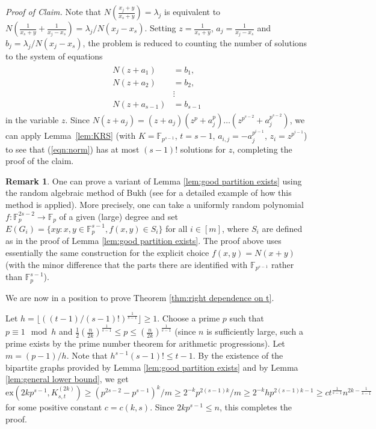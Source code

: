 \documentclass[a4paper,11pt]{article}
\makeatletter
\renewenvironment{proof}[1][\proofname] {\par\pushQED{\qed}\normalfont\topsep6\p@\@plus6\p@\relax\trivlist\item[\hskip\labelsep\bfseries#1\@addpunct{.}]\ignorespaces}{\popQED\endtrivlist\@endpefalse}
\theoremstyle{definition}
\newtheorem{remark}[theorem]{\bf Remark}
\def\ex{\mathrm{ex}}
\makeatother
\begin{document}
\begin{proof}[Proof of Lemma \ref{lem:good partition exists}]
    \noindent \emph{Proof of Claim.} Note that $N(\frac{x_j+y}{x_s+y})=\lambda_j$ is equivalent to $N(\frac{1}{x_s+y}+\frac{1}{x_j-x_s})=\lambda_j/N(x_j-x_s)$. Setting $z=\frac{1}{x_s+y}$, $a_j=\frac{1}{x_j-x_s}$ and $b_j=\lambda_j/N(x_j-x_s)$, the problem is reduced to counting the number of solutions to the system of equations
    \begin{align} \label{eqn:norm}
    \begin{split}
        N(z+a_1)&=b_1, \\
        N(z+a_2)&=b_2, \\
        &\vdots \\
        N(z+a_{s-1})&=b_{s-1}
    \end{split}
    \end{align}
    in the variable $z$. Since $N(z+a_j)=(z+a_j)(z^p+a_j^p)\dots (z^{p^{s-2}}+a_j^{p^{s-2}})$, we can apply Lemma~\ref{lem:KRS} (with $K=\mathbb{F}_{p^{s-1}}$, $t=s-1$, $a_{i,j}=-a_j^{p^{i-1}}$, $z_i=z^{p^{i-1}}$) to see that (\ref{eqn:norm}) has at most $(s-1)!$ solutions for $z$, completing the proof of the claim.
\end{proof}

\begin{remark}
    One can prove a variant of Lemma \ref{lem:good partition exists} using the random algebraic method of Bukh (see \cite{Bukh15} for a detailed example of how this method is applied). More precisely, one can take a uniformly random polynomial $f:\mathbb{F}_p^{2s-2}\rightarrow \mathbb{F}_p$ of a given (large) degree and set $E(G_i)=\{xy: x,y\in \mathbb{F}_p^{s-1}, f(x,y)\in S_i\}$ for all $i\in [m]$, where $S_i$ are defined as in the proof of Lemma \ref{lem:good partition exists}. The proof above uses essentially the same construction for the explicit choice $f(x,y)=N(x+y)$ (with the minor difference that the parts there are identified with $\mathbb{F}_{p^{s-1}}$ rather than $\mathbb{F}_p^{s-1}$).
\end{remark}

We are now in a position to prove Theorem \ref{thm:right dependence on t}.

\begin{proof}[Proof of Theorem \ref{thm:right dependence on t}]
    Let $h=\lfloor ((t-1)/(s-1)!)^{\frac{1}{s-1}}\rfloor \ge 1$. Choose a prime $p$ such that $p\equiv 1 \mod h$ and $\frac{1}{2}(\frac{n}{2k})^{\frac{1}{s-1}}\leq p\leq (\frac{n}{2k})^{\frac{1}{s-1}}$ (since $n$ is sufficiently large, such a prime exists by the prime number theorem for arithmetic progressions).  %
    Let $m=(p-1)/h$. Note that $h^{s-1}(s-1)!\leq t-1$. By the existence of the bipartite graphs provided by Lemma \ref{lem:good partition exists} and by Lemma \ref{lem:general lower bound}, we get
    $$\ex(2kp^{s-1},K_{s,t}^{(2k)})\geq (p^{2s-2}-p^{s-1})^k/m\geq 2^{-k}p^{2(s-1)k}/m\geq 2^{-k}hp^{2(s-1)k-1}\geq ct^{\frac{1}{s-1}}n^{2k-\frac{1}{s-1}}$$
    for some positive constant $c=c(k,s)$. Since $2kp^{s-1}\leq n$, this completes the proof.
\end{proof}
\end{document}
